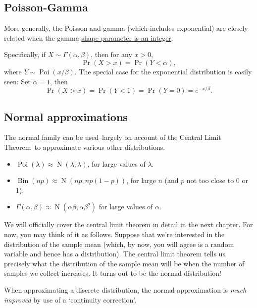 \documentclass[
]{book}
\providecommand{\tightlist}{%
  \setlength{\itemsep}{0pt}\setlength{\parskip}{0pt}}
\DeclareMathOperator{\N}{N}
\DeclareMathOperator{\Bin}{Bin}
\DeclareMathOperator{\Pois}{Poi}
\theoremstyle{definition}
\theoremstyle{definition}
\theoremstyle{definition}
\theoremstyle{definition}
\theoremstyle{remark}
\begin{document}
\hypertarget{poisson-gamma}{%
\subsection{Poisson-Gamma}\label{poisson-gamma}}

More generally, the Poisson and gamma (which includes exponential) are closely related when the gamma \underline{shape parameter is an integer}.

Specifically, if \(X\sim\Gamma(\alpha,\beta)\), then for any \(x>0\),
\[
\Pr(X>x) = \Pr(Y<\alpha),
\]
where \(Y\sim\Pois(x/\beta)\).
The special case for the exponential distribution is easily seen: Set \(\alpha=1\), then
\[
\Pr(X>x) = \Pr(Y<1) = \Pr(Y=0) = e^{-x/\beta}.
\]

\hypertarget{normal-approximations}{%
\subsection{Normal approximations}\label{normal-approximations}}

The normal family can be used--largely on account of the Central Limit Theorem--to approximate various other distributions.

\begin{itemize}
\tightlist
\item
  \(\Pois(\lambda) \approx \N(\lambda,\lambda)\), for large values of \(\lambda\).
\item
  \(\Bin(np) \approx \N(np,np(1-p))\), for large \(n\) (and \(p\) not too close to 0 or 1).
\item
  \(\Gamma(\alpha,\beta) \approx \N(\alpha\beta, \alpha\beta^2)\) for large values of \(\alpha\).
\end{itemize}

We will officially cover the central limit theorem in detail in the next chapter. For now, you may think of it as follows. Suppose that we're interested in the distribution of the sample mean (which, by now, you will agree is a random variable and hence has a distribution). The central limit theorem tells us precisely what the distribution of the sample mean will be when the number of samples we collect increases. It turns out to be the normal distribution!

When approximating a discrete distribution, the normal approximation is \emph{much improved} by use of a `continuity correction'.
\end{document}
